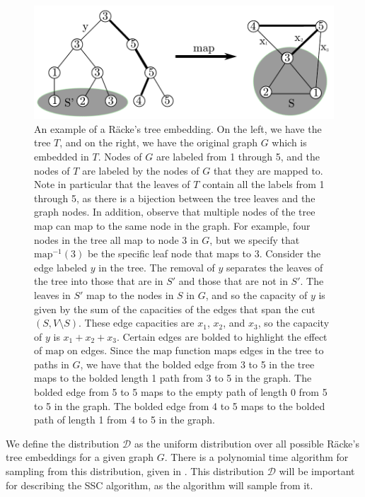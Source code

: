 \documentclass[12pt]{article}
\begin{document}
\begin{figure}
\label{fig:racketree}
\includegraphics[width=\linewidth]{RackeTree.pdf}
\caption{An example of a R\"{a}cke's tree embedding. On the left, we have the tree $T$, and on the right, we have the original graph $G$ which is embedded in $T$. Nodes of $G$ are labeled from 1 through 5, and the nodes of $T$ are labeled by the nodes of $G$ that they are mapped to. Note in particular that the leaves of $T$ contain all the labels from 1 through 5, as there is a bijection between the tree leaves and the graph nodes. In addition, observe that multiple nodes of the tree map can map to the same node in the graph. For example, four nodes in the tree all map to node 3 in $G$, but we specify that $\mathrm{map}^{-1}(3)$ be the specific leaf node that maps to 3.
\newline
\text{ }\hspace{.3in} Consider the edge labeled $y$ in the tree. The removal of $y$ separates the leaves of the tree into those that are in $S'$ and those that are not in $S'$. The leaves in $S'$ map to the nodes in $S$ in $G$, and so the capacity of $y$ is given by the sum of the capacities of the edges that span the cut $(S,V\setminus S)$. These edge capacities are $x_1$, $x_2$, and $x_3$, so the capacity of $y$ is $x_1 + x_2+x_3$.
\newline
\text{ }\hspace{.3in} Certain edges are bolded to highlight the effect of $\mathrm{map}$ on edges. Since the $\mathrm{map}$ function maps edges in the tree to paths in $G$, we have that the bolded edge from 3 to 5 in the tree maps to the bolded length 1 path from 3 to 5 in the graph. The bolded edge from 5 to 5 maps to the empty path of length 0 from 5 to 5 in the graph. The bolded edge from 4 to 5 maps to the bolded path of length 1 from 4 to 5 in the graph.}
\end{figure}

We define the distribution $\mathcal{D}$ as the uniform distribution over all possible R\"{a}cke's tree embeddings for a given graph $G$. There is a polynomial time algorithm for sampling from this distribution, given in \cite{racke}. This distribution $\mathcal{D}$ will be important for describing the SSC algorithm, as the algorithm will sample from it.\\
\end{document}
